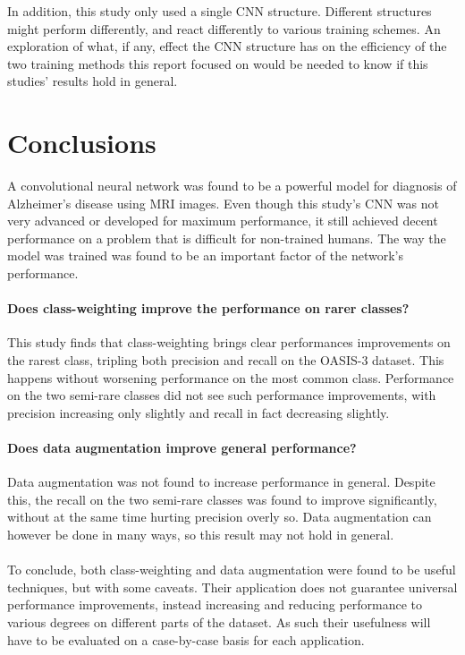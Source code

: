 \documentclass{kththesis}
\begin{document}
In addition, this study only used a single CNN structure. Different structures might perform differently, and react differently to various training schemes. An exploration of what, if any, effect the CNN structure has on the efficiency of the two training methods this report focused on would be needed to know if this studies' results hold in general.

\chapter{Conclusions}
A convolutional neural network was found to be a powerful model for diagnosis of Alzheimer’s disease using MRI images. Even though this study's CNN was not very advanced or developed for maximum performance, it still achieved decent performance on a problem that is difficult for non-trained humans. The way the model was trained was found to be an important factor of the network's performance.

\subsubsection{Does class-weighting improve the performance on rarer classes?}
This study finds that class-weighting brings clear performances improvements on the rarest class, tripling both precision and recall on the OASIS-3 dataset. This happens without worsening performance on the most common class. Performance on the two semi-rare classes did not see such performance improvements, with precision increasing only slightly and recall in fact decreasing slightly.

\subsubsection{Does data augmentation improve general performance?}
Data augmentation was not found to increase performance in general. Despite this, the recall on the two semi-rare classes was found to improve significantly, without at the same time hurting precision overly so. Data augmentation can however be done in many ways, so this result may not hold in general.

\subsubsection*{}
To conclude, both class-weighting and data augmentation were found to be useful techniques, but with some caveats. Their application does not guarantee universal performance improvements, instead increasing and reducing performance to various degrees on different parts of the dataset. As such their usefulness will have to be evaluated on a case-by-case basis for each application.
\end{document}
